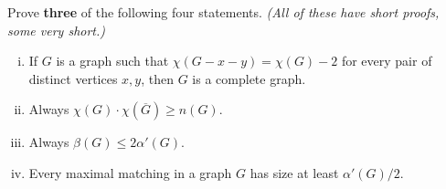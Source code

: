 \documentclass[addpoints,10pt]{exam}
\begin{document}
\begin{questions}
\newpage

\question[24] Prove \textbf{three} of the following four statements.  \textit{(All of these have short proofs, some \emph{very} short.)}
\begin{enumerate}[(i)]
\item %
If $G$ is a graph such that $\chi(G-x-y)=\chi(G)-2$ for every pair of distinct vertices $x,y$, then $G$ is a complete graph.


\item Always $\chi(G)\cdot \chi(\overline{G})\geq n(G)$.


\item %
Always $\beta(G)\leq 2\alpha'(G)$. %

\item %
Every maximal matching in a graph $G$ has size at least $\alpha'(G)/2$.


\end{enumerate}
\end{questions}
\end{document}
